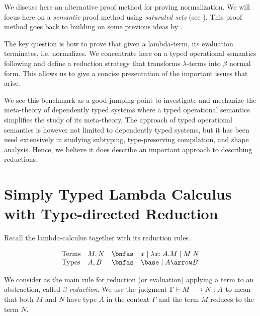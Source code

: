 We discuss here an alternative proof method for proving
normalization. We will focus here on a \emph{semantic} proof method
using \emph{saturated sets} (see \cite{Luo:PHD90}). This proof method
goes back to \cite{Girard1972} building on some previous ideas
by \cite{Tait67}.

The key question is how to prove that given a lambda-term, its
evaluation terminates, i.e. normalizes. We concentrate here on a typed
operational semantics following \cite{Goguen:TLCA95} and define
a reduction strategy that transforms $\lambda$-terms into
$\beta$ normal form. This allows us to give a concise presentation of the important issues that arise.

 We see this benchmark as a good jumping point to investigate and mechanize the meta-theory of dependently typed systems where a typed operational semantics simplifies the study of its meta-theory. The approach of typed operational semantics is however not limited to dependently typed systems, but it has been used extensively in studying subtyping,  type-preserving compilation, and shape analysis. Hence, we believe it does describe an important approach to describing reductions.



\section{Simply Typed Lambda Calculus with Type-directed Reduction}
Recall the lambda-calculus together with its reduction rules.


\[
\begin{array}{llcl}
\mbox{Terms}  & M,N & \bnfas & x \mid \lambda x{:A}. M \mid M\;N \\
\mbox{Types} & A, B & \bnfas & \base \mid A \arrow B
\end{array}
\]

We consider as the main rule for reduction (or evaluation) applying a term to an abstraction, called \emph{$\beta$-reduction}.
 We use the judgment $\Gamma \vdash M \longrightarrow N :A$ to mean that both $M$ and $N$ have type $A$ in the context $\Gamma$ and the term $M$ reduces to the term $N$.



